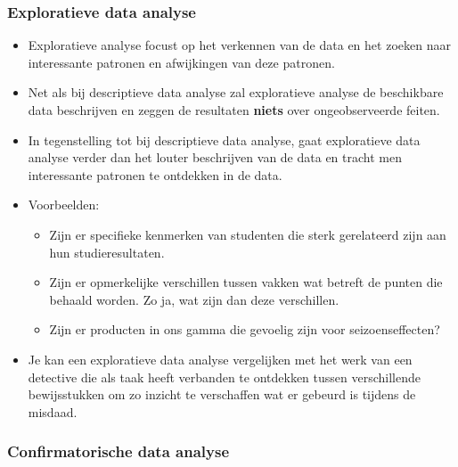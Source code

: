 \documentclass[]{tufte-book}
\providecommand{\tightlist}{%
  \setlength{\itemsep}{0pt}\setlength{\parskip}{0pt}}
\begin{document}
\hypertarget{exploratieve-data-analyse}{%
\subsubsection*{Exploratieve data analyse}\label{exploratieve-data-analyse}}

\begin{itemize}
\tightlist
\item
  Exploratieve analyse focust op het verkennen van de data en het zoeken naar interessante patronen en afwijkingen van deze patronen.
\item
  Net als bij descriptieve data analyse zal exploratieve analyse de beschikbare data beschrijven en zeggen de resultaten \textbf{niets} over ongeobserveerde feiten.
\item
  In tegenstelling tot bij descriptieve data analyse, gaat exploratieve data analyse verder dan het louter beschrijven van de data en tracht men interessante patronen te ontdekken in de data.
\item
  Voorbeelden:

  \begin{itemize}
  \tightlist
  \item
    Zijn er specifieke kenmerken van studenten die sterk gerelateerd zijn aan hun studieresultaten.
  \item
    Zijn er opmerkelijke verschillen tussen vakken wat betreft de punten die behaald worden. Zo ja, wat zijn dan deze verschillen.
  \item
    Zijn er producten in ons gamma die gevoelig zijn voor seizoenseffecten?
  \end{itemize}
\item
  Je kan een exploratieve data analyse vergelijken met het werk van een detective die als taak heeft verbanden te ontdekken tussen verschillende bewijsstukken om zo inzicht te verschaffen wat er gebeurd is tijdens de misdaad.
\end{itemize}

\hypertarget{confirmatorische-data-analyse}{%
\subsubsection*{Confirmatorische data analyse}\label{confirmatorische-data-analyse}}
\end{document}
